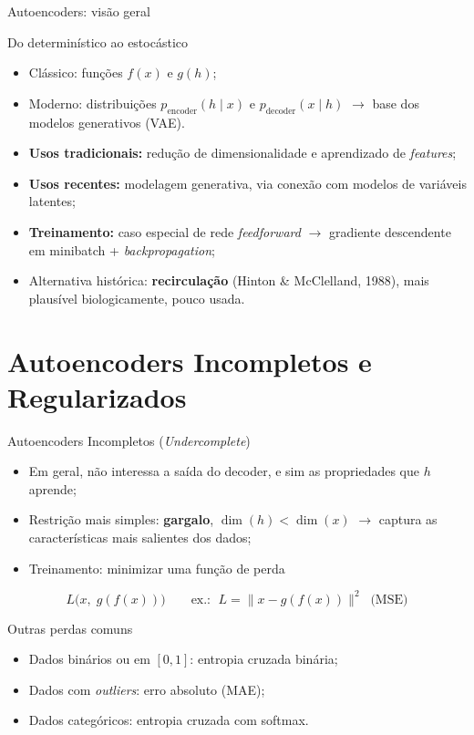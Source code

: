 \documentclass[aspectratio=169,xcolor=dvipsnames]{beamer}
\begin{document}
\begin{frame}{Autoencoders: visão geral}
    \begin{block}{Do determinístico ao estocástico}
        \begin{itemize}
            \item Clássico: funções $f(x)$ e $g(h)$;
            \item Moderno: distribuições $p_{\text{encoder}}(h \mid x)$ e $p_{\text{decoder}}(x \mid h)$ $\rightarrow$ base dos modelos generativos (VAE).
        \end{itemize}
    \end{block}
    \begin{itemize}
        \item \textbf{Usos tradicionais:} redução de dimensionalidade e aprendizado de \textit{features};
        \item \textbf{Usos recentes:} modelagem generativa, via conexão com modelos de variáveis latentes;
        \item \textbf{Treinamento:} caso especial de rede \textit{feedforward} $\rightarrow$ gradiente descendente em minibatch + \textit{backpropagation};
        \item Alternativa histórica: \textbf{recirculação} (Hinton \& McClelland, 1988), mais plausível biologicamente, pouco usada.
    \end{itemize}
\end{frame}

\section{Autoencoders Incompletos e Regularizados}

\begin{frame}{Autoencoders Incompletos (\textit{Undercomplete})}
    \begin{itemize}
        \item Em geral, não interessa a saída do decoder, e sim as propriedades que $h$ aprende;
        \item Restrição mais simples: \textbf{gargalo}, $\dim(h) < \dim(x)$ $\rightarrow$ captura as características mais salientes dos dados;
        \item Treinamento: minimizar uma função de perda
    \end{itemize}
    \[
        L\big(x,\; g(f(x))\big)
        \qquad \text{ex.: } \; L = \lVert x - g(f(x)) \rVert^2 \;\; \text{(MSE)}
    \]
    \begin{block}{Outras perdas comuns}
        \begin{itemize}
            \item Dados binários ou em $[0,1]$: entropia cruzada binária;
            \item Dados com \textit{outliers}: erro absoluto (MAE);
            \item Dados categóricos: entropia cruzada com softmax.
        \end{itemize}
    \end{block}
\end{frame}
 
\end{document}
